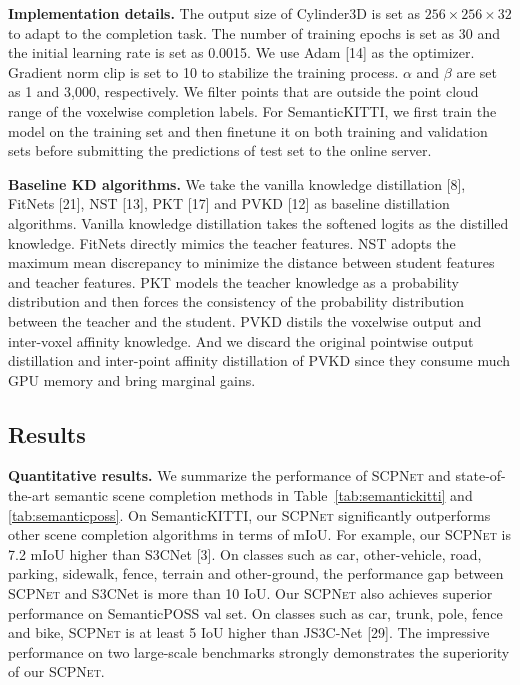 \documentclass[10pt,twocolumn,letterpaper]{article}
\newcommand{\methodname}{\textsc{SCPNet}}
\begin{document}
\textbf{Implementation details.}
The output size of Cylinder3D is set as $256\times256\times32$ to adapt to the completion task. The number of training epochs is set as 30 and the initial learning rate is set as 0.0015. We use Adam [14] as the optimizer. Gradient norm clip is set to 10 to stabilize the training process. $\alpha$ and $\beta$ are set as 1 and 3,000, respectively. We filter points that are outside the point cloud range of the voxelwise completion labels. For SemanticKITTI, we first train the model on the training set and then finetune it on both training and validation sets before submitting the predictions of test set to the online server.

\textbf{Baseline KD algorithms.}
We take the vanilla knowledge distillation [8], FitNets [21], NST [13], PKT [17] and PVKD [12] as baseline distillation algorithms. Vanilla knowledge distillation takes the softened logits as the distilled knowledge. FitNets directly mimics the teacher features. NST adopts the maximum mean discrepancy to minimize the distance between student features and teacher features. PKT models the teacher knowledge as a probability distribution and then forces the consistency of the probability distribution between the teacher and the student. PVKD distils the voxelwise output and inter-voxel affinity knowledge. And we discard the original pointwise output distillation and inter-point affinity distillation of PVKD since they consume much GPU memory and bring marginal gains.

\subsection{Results}

\textbf{Quantitative results.}
We summarize the performance of \methodname{} and state-of-the-art semantic scene completion methods in Table~\ref{tab:semantickitti} and \ref{tab:semanticposs}. On SemanticKITTI, our \methodname{} significantly outperforms other scene completion algorithms in terms of mIoU. For example, our \methodname{} is 7.2 mIoU higher than S3CNet [3]. On classes such as car, other-vehicle, road, parking, sidewalk, fence, terrain and other-ground, the performance gap between \methodname{} and S3CNet is more than 10 IoU. Our \methodname{} also achieves superior performance on SemanticPOSS val set. On classes such as car, trunk, pole, fence and bike, \methodname{} is at least 5 IoU higher than JS3C-Net [29]. The impressive performance on two large-scale benchmarks strongly demonstrates the superiority of our \methodname{}.
\end{document}
